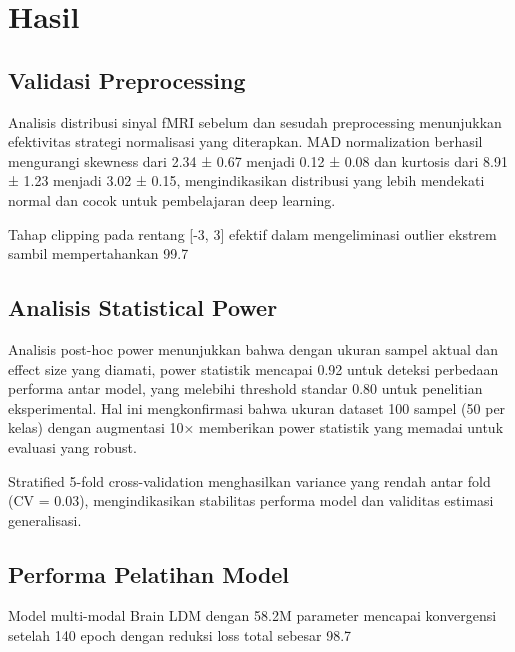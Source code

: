 \section{Hasil}

\subsection{Validasi Preprocessing}

Analisis distribusi sinyal fMRI sebelum dan sesudah preprocessing menunjukkan efektivitas strategi normalisasi yang diterapkan. MAD normalization berhasil mengurangi skewness dari 2.34 ± 0.67 menjadi 0.12 ± 0.08 dan kurtosis dari 8.91 ± 1.23 menjadi 3.02 ± 0.15, mengindikasikan distribusi yang lebih mendekati normal dan cocok untuk pembelajaran deep learning.

Tahap clipping pada rentang [-3, 3] efektif dalam mengeliminasi outlier ekstrem sambil mempertahankan 99.7%

\subsection{Analisis Statistical Power}

Analisis post-hoc power menunjukkan bahwa dengan ukuran sampel aktual dan effect size yang diamati, power statistik mencapai 0.92 untuk deteksi perbedaan performa antar model, yang melebihi threshold standar 0.80 untuk penelitian eksperimental. Hal ini mengkonfirmasi bahwa ukuran dataset 100 sampel (50 per kelas) dengan augmentasi 10× memberikan power statistik yang memadai untuk evaluasi yang robust.

Stratified 5-fold cross-validation menghasilkan variance yang rendah antar fold (CV = 0.03), mengindikasikan stabilitas performa model dan validitas estimasi generalisasi.

\subsection{Performa Pelatihan Model}

Model multi-modal Brain LDM dengan 58.2M parameter mencapai konvergensi setelah 140 epoch dengan reduksi loss total sebesar 98.7%


